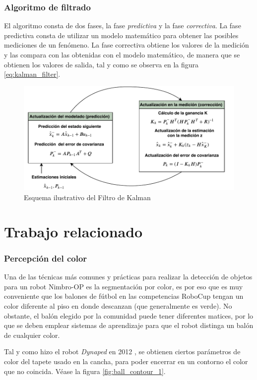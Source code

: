 		\subsubsection{Algoritmo de filtrado}
El algoritmo consta de dos fases, la fase \textit{predictiva} y la fase \textit{correctiva}. La fase predictiva consta de utilizar un modelo matemático para obtener las posibles mediciones de un fenómeno. La fase correctiva obtiene los valores de la medición y las compara con las obtenidas con el modelo matemático, de manera que se obtienen los valores de salida, tal y como se observa en la figura \ref{eq:kalman_filter}.

\begin{figure}
\centering
\includegraphics[scale=0.7]{images/kalman_algorithm.pdf}
\caption{Esquema ilustrativo del Filtro de Kalman}
\label{fig:Kalman_scheme}
\end{figure}

	\section{Trabajo relacionado}
		\subsubsection{Percepción del color}
	Una de las técnicas más comunes y prácticas para realizar la detección de objetos para un robot Nimbro-OP es la segmentación por color, es por eso que es muy conveniente que los balones de fútbol en las competencias RoboCup tengan un color diferente al piso en donde descanzan (que generalmente es verde). No obstante, el balón elegido por la comunidad puede tener diferentes matices, por lo que se deben emplear sistemas de aprendizaje para que el robot distinga un balón de cualquier color. 
	
	Tal y como hizo el robot \textit{Dynaped} en 2012 \citep{missura2012robocup}, se obtienen ciertos parámetros de color del tapete usado en la cancha,  para poder encerrar en un contorno el color que no coincida. Véase la figura \ref{fig:ball_contour_1}.
	
